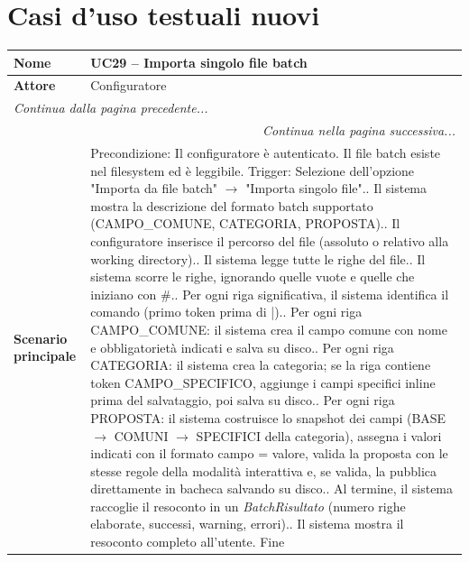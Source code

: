 \documentclass[12pt, a4paper, oneside]{report}
\begin{document}
\section{Casi d'uso testuali nuovi}
\renewcommand{\arraystretch}{1.4} 

\begin{tabularx}{\textwidth}{|l|X|}
    \hline
    \textbf{Nome} & \textbf{UC29 – Importa singolo file batch} \\ \hline
    \textbf{Attore} & Configuratore \\ \hline
    \endfirsthead 

    \hline
    \multicolumn{2}{|l|}{\textit{Continua dalla pagina precedente...}} \\ \hline
    \endhead 

    \hline
    \multicolumn{2}{|r|}{\textit{Continua nella pagina successiva...}} \\ \hline
    \endfoot 

    \hline
    \endlastfoot

    \textbf{Scenario principale} & 
    Precondizione: Il configuratore è autenticato. Il file batch esiste nel filesystem ed è leggibile.\newline
    Trigger: Selezione dell'opzione "Importa da file batch" $\rightarrow$ "Importa singolo file".\newline
    1. Il sistema mostra la descrizione del formato batch supportato (CAMPO\_COMUNE, CATEGORIA, PROPOSTA).\newline
    2. Il configuratore inserisce il percorso del file (assoluto o relativo alla working directory).\newline
    3. Il sistema legge tutte le righe del file.\newline
    4. Il sistema scorre le righe, ignorando quelle vuote e quelle che iniziano con \#.\newline
    5. Per ogni riga significativa, il sistema identifica il comando (primo token prima di |).\newline
    6. Per ogni riga CAMPO\_COMUNE: il sistema crea il campo comune con nome e obbligatorietà indicati e salva su disco.\newline
    7. Per ogni riga CATEGORIA: il sistema crea la categoria; se la riga contiene token CAMPO\_SPECIFICO, aggiunge i campi specifici inline prima del salvataggio, poi salva su disco.\newline
    8. Per ogni riga PROPOSTA: il sistema costruisce lo snapshot dei campi (BASE $\rightarrow$ COMUNI $\rightarrow$ SPECIFICI della categoria), assegna i valori indicati con il formato campo = valore, valida la proposta con le stesse regole della modalità interattiva e, se valida, la pubblica direttamente in bacheca salvando su disco.\newline
    9. Al termine, il sistema raccoglie il resoconto in un \textit{BatchRisultato} (numero righe elaborate, successi, warning, errori).\newline
    10. Il sistema mostra il resoconto completo all'utente.\newline
    Fine \\ \hline
    

\end{tabularx}
\end{document}
